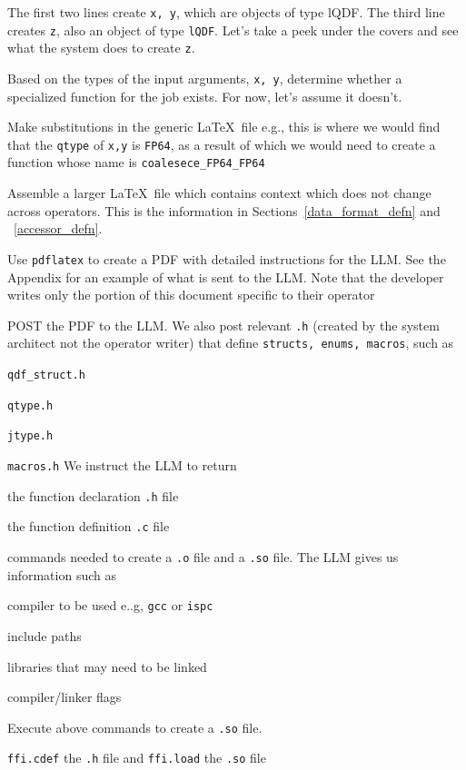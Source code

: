 \documentclass[letterpaper,12pt]{article}
\begin{document}
The first two lines create {\tt x, y}, which are objects of type lQDF.
The third line creates {\tt z}, also an object of type {\tt lQDF}. 
Let's take a peek under the covers and see what the system does
to create {\tt z}.
\be
\item Based on the types of the input arguments, {\tt x, y}, 
determine whether a specialized function for the job exists. 
For now, let's assume it doesn't.
\item Make substitutions in the generic \LaTeX\ file e.g., this is where we 
  would find that the {\tt qtype} of {\tt x,y} is {\tt FP64}, as 
  a result of which we would need to create a function whose name is 
  \verb+coalesece_FP64_FP64+
\item Assemble a larger \LaTeX\ file which contains 
  context which does not change across operators. 
  This is the information in Sections~\ref{data_format_defn} and 
  ~\ref{accessor_defn}.
\item Use {\tt pdflatex} to create a PDF with detailed instructions for the LLM.
  See the Appendix for an example of what is sent to the LLM. Note that the
  developer writes only the portion of this document specific to their 
  operator
\item POST the PDF to the LLM. We also post relevant {\tt .h} (created by the
  system architect not the operator writer) that 
  define {\tt structs, enums, macros}, such as 
  \be
\item  \verb+qdf_struct.h+ 
\item  \verb+qtype.h+ 
\item  \verb+jtype.h+ 
\item  \verb+macros.h+ 
  \ee
We instruct the LLM to return 
  \be
\item the function declaration {\tt .h} file 
\item the function definition {\tt .c} file 
\item commands needed to create a {\tt .o} file and a {\tt .so} file. 
 The LLM gives us information such as
  \be
\item compiler to be used e..g, {\tt gcc} or {\tt ispc}
\item include paths
\item libraries that may need to be linked
\item compiler/linker flags 
  \ee
  \ee
\item Execute above commands to create a {\tt .so} file. 
\item \verb+ffi.cdef+ the {\tt .h} file and \verb+ffi.load+ the {\tt .so} file
\end{document}
